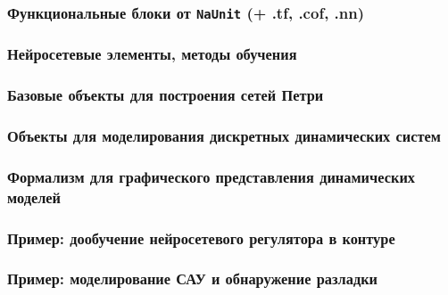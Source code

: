 \subsubsection{Функциональные блоки от {\tt NaUnit} (+ .tf, .cof, .nn)}
\subsubsection{Нейросетевые элементы, методы обучения}
\subsubsection{Базовые объекты для построения сетей Петри}
\subsubsection{Объекты для моделирования дискретных динамических систем}
\subsubsection{Формализм для графического представления динамических моделей}
\subsubsection{Пример: дообучение нейросетевого регулятора в контуре}
\subsubsection{Пример: моделирование САУ и обнаружение разладки}
